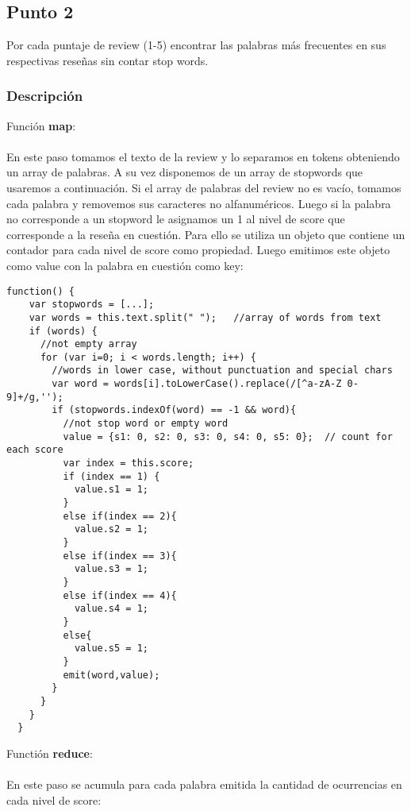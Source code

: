 \subsection{Punto 2}
Por cada puntaje de review (1-5) encontrar las palabras más frecuentes en sus respectivas reseñas sin contar stop words.

\subsubsection{Descripción}

Función \textbf{map}:\\\\
En este paso tomamos el texto de la review y lo separamos en tokens obteniendo un array de palabras. A su vez disponemos de un array de stopwords que usaremos a continuación. Si el array de palabras del review no es vacío, tomamos cada palabra y removemos sus caracteres no alfanuméricos. Luego si la palabra no corresponde a un stopword le asignamos un 1 al nivel de score que corresponde a la reseña en cuestión. Para ello se utiliza un objeto que contiene un contador para cada nivel de score como propiedad. Luego emitimos este objeto como value con la palabra en cuestión como key:

\begin{lstlisting}[frame=leftline]
  function() {
    var stopwords = [...];
    var words = this.text.split(" ");	//array of words from text
    if (words) {
      //not empty array
      for (var i=0; i < words.length; i++) {
        //words in lower case, without punctuation and special chars
        var word = words[i].toLowerCase().replace(/[^a-zA-Z 0-9]+/g,'');
        if (stopwords.indexOf(word) == -1 && word){	
          //not stop word or empty word
          value = {s1: 0, s2: 0, s3: 0, s4: 0, s5: 0};	// count for each score
          var index = this.score;
          if (index == 1) {
            value.s1 = 1;
          }				
          else if(index == 2){
            value.s2 = 1;
          }
          else if(index == 3){
            value.s3 = 1;
          }
          else if(index == 4){
            value.s4 = 1;
          }
          else{
            value.s5 = 1;
          }
          emit(word,value);
        }
      }
    }
  }
\end{lstlisting}

Functión \textbf{reduce}:\\\\
En este paso se acumula para cada palabra emitida la cantidad de ocurrencias en cada nivel de score:

